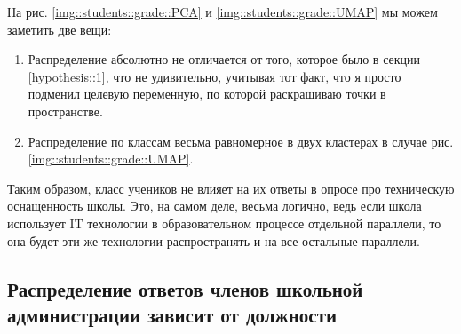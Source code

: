На рис. \ref{img::students::grade::PCA} и \ref{img::students::grade::UMAP} мы можем заметить две вещи:
\begin{enumerate}
    \item Распределение абсолютно не отличается от того, которое было в секции \ref{hypothesis::1}, что не удивительно, учитывая тот факт, что я просто подменил целевую переменную, по которой раскрашиваю точки в пространстве.
    \item Распределение по классам весьма равномерное в двух кластерах в случае рис. \ref{img::students::grade::UMAP}.
\end{enumerate}
Таким образом, класс учеников не влияет на их ответы в опросе про техническую оснащенность школы.
Это, на самом деле, весьма логично, ведь если школа использует IT технологии в образовательном процессе отдельной параллели, то она будет эти же технологии распространять и на все остальные параллели.

\subsection{Распределение ответов членов школьной администрации зависит от должности}

